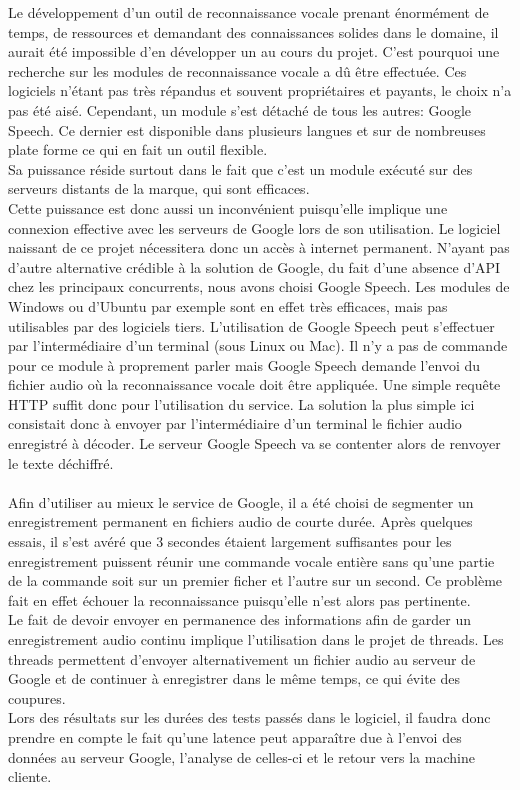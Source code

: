 \documentclass[a4paper, 11pt]{report}
\begin{document}
	Le développement d'un outil de reconnaissance vocale prenant énormément de temps, de ressources et demandant des connaissances solides dans le domaine, il aurait été impossible d'en développer un au cours du projet. C'est pourquoi une recherche sur les modules de reconnaissance vocale a dû être effectuée. Ces logiciels n'étant pas très répandus et souvent propriétaires et payants, le choix n'a pas été aisé. Cependant, un module s'est détaché de tous les autres: Google Speech. Ce dernier est disponible dans plusieurs langues et sur de nombreuses plate forme ce qui en fait un outil flexible.\\
	Sa puissance réside surtout dans le fait que c'est un module exécuté sur des serveurs distants de la marque, qui sont efficaces.\\
	Cette puissance est donc aussi un inconvénient puisqu'elle implique une connexion effective avec les serveurs de Google lors de son utilisation. Le logiciel naissant de ce projet nécessitera donc un accès à internet permanent. N'ayant pas d'autre alternative crédible à la solution de Google, du fait d'une absence d'API chez les principaux concurrents, nous avons choisi Google Speech. Les modules de Windows ou d'Ubuntu par exemple sont en effet très efficaces, mais pas utilisables par des logiciels tiers.
	L'utilisation de Google Speech peut s'effectuer par l'intermédiaire d'un terminal (sous Linux ou Mac). Il n'y a pas de commande pour ce module à proprement parler mais Google Speech demande l'envoi du fichier audio où la reconnaissance vocale doit être appliquée. Une simple requête HTTP suffit donc pour l'utilisation du service. La solution la plus simple ici consistait donc à envoyer par l'intermédiaire d'un terminal le fichier audio enregistré à décoder. Le serveur Google Speech va se contenter alors de renvoyer le texte déchiffré.\\ \ \\
	Afin d'utiliser au mieux le service de Google, il a été choisi de segmenter un enregistrement permanent en fichiers audio de courte durée. Après quelques essais, il s'est avéré que 3 secondes étaient largement suffisantes pour les enregistrement puissent réunir une commande vocale entière sans qu'une partie de la commande soit sur un premier ficher et l'autre sur un second. Ce problème fait en effet échouer la reconnaissance puisqu'elle n'est alors pas pertinente.\\
	Le fait de devoir envoyer en permanence des informations afin de garder un enregistrement audio continu implique l'utilisation dans le projet de threads. Les threads permettent d'envoyer alternativement un fichier audio au serveur de Google et de continuer à enregistrer dans le même temps, ce qui évite des coupures.\\
	Lors des résultats sur les durées des tests passés dans le logiciel, il faudra donc prendre en compte le fait qu'une latence peut apparaître due à l'envoi des données au serveur Google, l'analyse de celles-ci et le retour vers la machine cliente.
	
\end{document}
